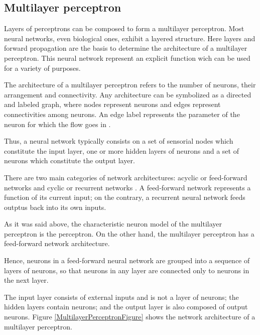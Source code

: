 \subsection*{Multilayer perceptron}




Layers of perceptrons can be composed to form a multilayer perceptron. Most neural networks, 
even biological ones, exhibit a layered structure. Here
layers and forward propagation are the basis to determine the architecture of a multilayer perceptron. This neural network represent an explicit function wich can be used for a variety of purposes. 


The architecture
of a multilayer perceptron refers to the number of neurons, their
arrangement and connectivity. Any
 architecture can be symbolized as a directed and labeled
graph, where nodes represent neurons and edges represent
connectivities among neurons. An edge label represents the
parameter of the neuron for which the flow goes in
\cite{Belanche2000}.

Thus, a neural network typically consists on a set of sensorial
nodes which constitute the input layer, one or more hidden layers of
neurons and a set of neurons which constitute the output layer.

There are two main categories of network architectures: acyclic or feed-forward networks 
and cyclic or recurrent networks \cite{Russell2009}. A feed-forward network represents 
a function of its current input; on the contrary, a recurrent neural network feeds outptus back into
its own inputs. 

As it was said above, the characteristic neuron model of the
multilayer perceptron is the perceptron. On the other hand, the
multilayer perceptron has a feed-forward network architecture.

Hence, neurons in a feed-forward neural network are
grouped into a sequence of layers of neurons, so that neurons in any layer are connected only to
neurons in the next layer. 

The input layer consists of external inputs and is not a layer of neurons; 
the hidden layers contain neurons; 
and the output layer is also composed of output neurons. 
Figure \ref{MultilayerPerceptronFigure} shows the network architecture of a multilayer perceptron. 

